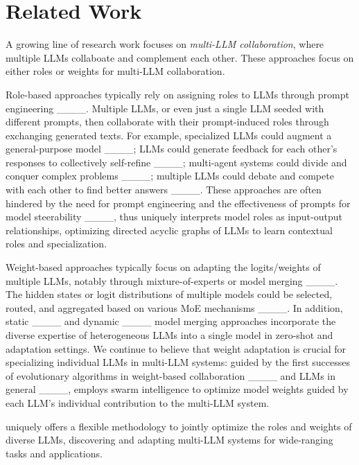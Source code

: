 \section{Related Work}
A growing line of research work focuses on \emph{multi-LLM collaboration}, where multiple LLMs collaboate and complement each other. These approaches focus on either roles or weights for multi-LLM collaboration.

Role-based approaches typically rely on assigning roles to LLMs through prompt engineering ____. Multiple LLMs, or even just a single LLM seeded with different prompts, then collaborate with their prompt-induced roles through exchanging generated texts. For example, specialized LLMs could augment a general-purpose model ____; LLMs could generate feedback for each other's responses to collectively self-refine ____; multi-agent systems could divide and conquer complex problems ____; multiple LLMs could debate and compete with each other to find better answers  ____. These approaches are often hindered by the need for prompt engineering and the effectiveness of prompts for model steerability ____, thus \ourmethod{} uniquely interprets model roles as input-output relationships, optimizing directed acyclic graphs of LLMs to learn contextual roles and specialization.

Weight-based approaches typically focus on adapting the logits/weights of multiple LLMs, notably through mixture-of-experts or model merging ____. The hidden states or logit distributions of multiple models could be selected, routed, and aggregated based on various MoE mechanisms ____. In addition, static ____ and dynamic ____ model merging approaches incorporate the diverse expertise of heterogeneous LLMs into a single model in zero-shot and adaptation settings. We continue to believe that weight adaptation is crucial for specializing individual LLMs in multi-LLM systems: guided by the first successes of evolutionary algorithms in weight-based collaboration ____ and LLMs in general ____, \ourmethod{} employs swarm intelligence to optimize model weights guided by each LLM's individual contribution to the multi-LLM system.

\ourmethod{} uniquely offers a flexible methodology to jointly optimize the roles and weights of diverse LLMs, discovering and adapting multi-LLM systems for wide-ranging tasks and applications.

\vspace*{-5pt}